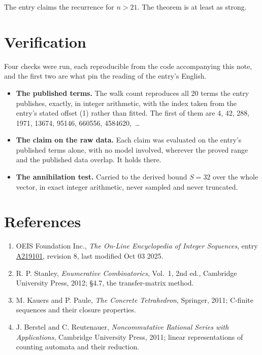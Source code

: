 \documentclass[11pt]{article}
\theoremstyle{definition}
\begin{document}
The entry claims the recurrence for $n > 21$. The theorem is at least as strong.

\section{Verification}

Four checks were run, each reproducible from the code accompanying this note, and the first two are what pin the reading of the entry's English.

\begin{itemize}

\item {\bfseries The published terms.} The walk count reproduces all 20 terms the entry publishes, exactly, in integer arithmetic, with the index taken from the entry's stated offset (1) rather than fitted. The first of them are 4, 42, 288, 1971, 13674, 95146, 660556, 4584620,~\dots

\item {\bfseries The claim on the raw data.} Each claim was evaluated on the entry's published terms alone, with no model involved, wherever the proved range and the published data overlap. It holds there.

\item {\bfseries The annihilation test.} Carried to the derived bound $S = 32$ over the whole vector, in exact integer arithmetic, never sampled and never truncated.

\end{itemize}

\section{References}

\begin{enumerate}

\item OEIS Foundation Inc., \emph{The On-Line Encyclopedia of Integer Sequences}, entry \href{https://oeis.org/A219101}{A219101}, revision 8, last modified Oct 03 2025.

\item R. P. Stanley, \emph{Enumerative Combinatorics}, Vol.~1, 2nd ed., Cambridge University Press, 2012; \S4.7, the transfer-matrix method.

\item M. Kauers and P. Paule, \emph{The Concrete Tetrahedron}, Springer, 2011; C-finite sequences and their closure properties.

\item J. Berstel and C. Reutenauer, \emph{Noncommutative Rational Series with Applications}, Cambridge University Press, 2011; linear representations of counting automata and their reduction.

\end{enumerate}
\end{document}
